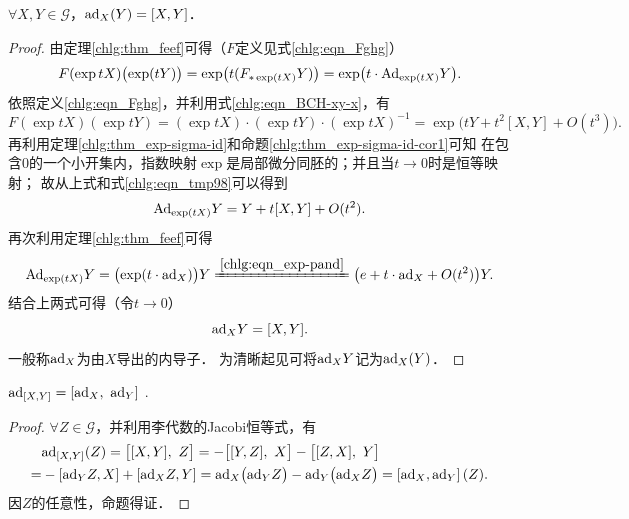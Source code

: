 \begin{theorem}\label{chlg:thm_adxy1}
    $\forall X,Y \in \mathscr{G}$，${\rm ad}_{X}(Y)=[X,Y]$．
\end{theorem}
\begin{proof}
    由定理\ref{chlg:thm_feef}可得（$F$定义见式\eqref{chlg:eqn_Fghg}）
    \begin{equation}\label{chlg:eqn_tmp98}
        F(\exp tX)\bigl(\exp (t Y)\bigr) = \exp \bigl(t (F_{*\exp (tX)} Y)\bigr)
        =\exp \bigl(t \cdot {\rm Ad}_{\exp (tX)} Y\bigr) .
    \end{equation}
    依照定义\eqref{chlg:eqn_Fghg}，并利用式\eqref{chlg:eqn_BCH-xy-x}，有
    \begin{equation*}
        F(\exp tX) (\exp tY) = (\exp tX)\cdot  (\exp tY) \cdot (\exp tX)^{-1}
        =\exp\bigl(tY+t^2[X,Y]+O(t^3)\bigr) .
    \end{equation*}
    再利用定理\ref{chlg:thm_exp-sigma-id}和命题\ref{chlg:thm_exp-sigma-id-cor1}可知
    在包含0的一个小开集内，指数映射$\exp$是局部微分同胚的；并且当$t\to 0$时是恒等映射；
    故从上式和式\eqref{chlg:eqn_tmp98}可以得到
    \begin{equation}
        {\rm Ad}_{\exp (tX)} Y = Y+t[X,Y]+O(t^2).
    \end{equation}
    再次利用定理\ref{chlg:thm_feef}可得
    \begin{equation}
        {\rm Ad}_{\exp (tX)} Y = \bigl(\exp (t\cdot {\rm ad}_X)\bigr) Y
        \xlongequal{\ref{chlg:eqn_exp-pand}}
        \bigl(e + t \cdot {\rm ad}_X + O(t^2)\bigr) Y .
    \end{equation}
    结合上两式可得（令$t\to 0$）
    \begin{equation}
        {\rm ad}_X  Y = [X,Y].
    \end{equation}
    一般称${\rm ad}_X $为由$X$导出的{\heiti 内导子}．
    为清晰起见可将${\rm ad}_X  Y$记为${\rm ad}_X  (Y)$．
\end{proof}

\begin{theorem}\label{chlg:thm_adxy2}
    ${\rm ad}_{[X,Y]} = \left[{\rm ad}_X,\  {\rm ad}_Y \right]$ .
\end{theorem}
\begin{proof}
    $\forall Z \in \mathscr{G}$，并利用李代数的Jacobi恒等式，有
    \begin{align*}
        &{\rm ad}_{[X,Y]}(Z) = \bigl[[X,Y],\ Z\bigr]
        = - \bigl[[Y,Z],\ X\bigr] - \bigl[[Z,X],\ Y\bigr] \\
        =& - \left[{\rm ad}_Y Z, X\right] + \left[{\rm ad}_X Z, Y\right] 
        = {\rm ad}_X\bigl( {\rm ad}_Y Z \bigr) - {\rm ad}_Y\bigl( {\rm ad}_X Z\bigr) 
        = \left[{\rm ad}_X,{\rm ad}_Y \right](Z) .
    \end{align*}
    因$Z$的任意性，命题得证．
\end{proof}

